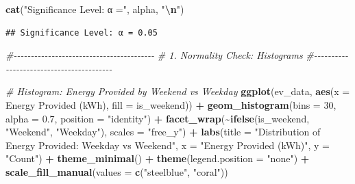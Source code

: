 \documentclass[
  12pt,
]{article}
\newenvironment{Shaded}{\begin{snugshade}}{\end{snugshade}}
\newcommand{\AttributeTok}[1]{\textcolor[rgb]{0.13,0.29,0.53}{#1}}
\newcommand{\CommentTok}[1]{\textcolor[rgb]{0.56,0.35,0.01}{\textit{#1}}}
\newcommand{\DecValTok}[1]{\textcolor[rgb]{0.00,0.00,0.81}{#1}}
\newcommand{\FloatTok}[1]{\textcolor[rgb]{0.00,0.00,0.81}{#1}}
\newcommand{\FunctionTok}[1]{\textcolor[rgb]{0.13,0.29,0.53}{\textbf{#1}}}
\newcommand{\NormalTok}[1]{#1}
\newcommand{\SpecialCharTok}[1]{\textcolor[rgb]{0.81,0.36,0.00}{\textbf{#1}}}
\newcommand{\StringTok}[1]{\textcolor[rgb]{0.31,0.60,0.02}{#1}}
\begin{document}
\begin{Shaded}
\begin{Highlighting}[]
\FunctionTok{cat}\NormalTok{(}\StringTok{"Significance Level: α ="}\NormalTok{, alpha, }\StringTok{"}\SpecialCharTok{\textbackslash{}n}\StringTok{"}\NormalTok{)}
\end{Highlighting}
\end{Shaded}

\begin{verbatim}
## Significance Level: α = 0.05
\end{verbatim}

\begin{Shaded}
\begin{Highlighting}[]
\CommentTok{\#{-}{-}{-}{-}{-}{-}{-}{-}{-}{-}{-}{-}{-}{-}{-}{-}{-}{-}{-}{-}{-}{-}{-}{-}{-}{-}{-}{-}{-}{-}{-}{-}{-}{-}{-}{-}{-}{-}{-}{-}{-}}
\CommentTok{\# 1. Normality Check: Histograms}
\CommentTok{\#{-}{-}{-}{-}{-}{-}{-}{-}{-}{-}{-}{-}{-}{-}{-}{-}{-}{-}{-}{-}{-}{-}{-}{-}{-}{-}{-}{-}{-}{-}{-}{-}{-}{-}{-}{-}{-}{-}{-}{-}{-}}

\CommentTok{\# Histogram: Energy Provided by Weekend vs Weekday}
\FunctionTok{ggplot}\NormalTok{(ev\_data, }\FunctionTok{aes}\NormalTok{(}\AttributeTok{x =} \StringTok{\textasciigrave{}}\AttributeTok{Energy Provided (kWh)}\StringTok{\textasciigrave{}}\NormalTok{, }\AttributeTok{fill =}\NormalTok{ is\_weekend)) }\SpecialCharTok{+}
    \FunctionTok{geom\_histogram}\NormalTok{(}\AttributeTok{bins =} \DecValTok{30}\NormalTok{, }\AttributeTok{alpha =} \FloatTok{0.7}\NormalTok{, }\AttributeTok{position =} \StringTok{"identity"}\NormalTok{) }\SpecialCharTok{+}
    \FunctionTok{facet\_wrap}\NormalTok{(}\SpecialCharTok{\textasciitilde{}}\FunctionTok{ifelse}\NormalTok{(is\_weekend, }\StringTok{"Weekend"}\NormalTok{, }\StringTok{"Weekday"}\NormalTok{), }\AttributeTok{scales =} \StringTok{"free\_y"}\NormalTok{) }\SpecialCharTok{+}
    \FunctionTok{labs}\NormalTok{(}\AttributeTok{title =} \StringTok{"Distribution of Energy Provided: Weekday vs Weekend"}\NormalTok{,}
        \AttributeTok{x =} \StringTok{"Energy Provided (kWh)"}\NormalTok{, }\AttributeTok{y =} \StringTok{"Count"}\NormalTok{) }\SpecialCharTok{+} \FunctionTok{theme\_minimal}\NormalTok{() }\SpecialCharTok{+}
    \FunctionTok{theme}\NormalTok{(}\AttributeTok{legend.position =} \StringTok{"none"}\NormalTok{) }\SpecialCharTok{+} \FunctionTok{scale\_fill\_manual}\NormalTok{(}\AttributeTok{values =} \FunctionTok{c}\NormalTok{(}\StringTok{"steelblue"}\NormalTok{,}
    \StringTok{"coral"}\NormalTok{))}
\end{Highlighting}
\end{Shaded}
\end{document}

